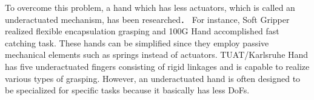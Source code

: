 \documentclass{llncs}
\begin{document}

To overcome this problem, a hand which has less actuators,
which is called an underactuated mechanism, has been researched\cite{Birglen2008}．
For instance, Soft Gripper realized flexible encapsulation
grasping\cite{Hirose1978} and 100G Hand accomplished fast catching
task\cite{Kaneko2003}.
These hands can be simplified since they employ passive mechanical elements
such as springs instead of actuators.
TUAT/Karlsruhe Hand has five underactuated fingers consisting of rigid linkages
and is capable to realize various types of grasping\cite{Fukaya2013}.
However, an underactuated hand is often designed to be specialized for specific tasks
because it basically has less DoFs.
\end{document}
